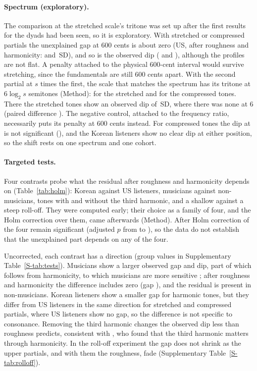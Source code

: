 \documentclass[11pt,a4paper]{article}
\newcommand{\SDu}{\,SD}
\begin{document}
\paragraph{Spectrum (exploratory).}
The comparison at the stretched scale's tritone was set up after the first results for the
dyads had been seen, so it is exploratory.
With stretched or compressed partials the unexplained gap at 600 cents is about zero (US,
after roughness and harmonicity: \gapHKHStr{} and \gapHKHComp\SDu), and so is the observed
dip (\dipObsStr{} and \dipObsComp), although the profiles are not flat. A penalty attached
to the physical 600-cent interval would survive stretching, since the fundamentals are still
600 cents apart. With the second partial at $s$ times the first, the scale that matches the
spectrum has its tritone at $6\log_2 s$ semitones (Method): \sscPosStr{} for the stretched and
\sscPosComp{} for the compressed tones. There the stretched tones show an observed dip of
\sscObsDipStr\SDu, where there was none at 6 (paired difference \sscObsDipStrDiff). The
negative control, attached to the frequency ratio, necessarily puts its penalty at 600
cents instead. For compressed tones the dip at \sscPosComp{} is not significant
(\sscObsDipComp), and the Korean listeners show no clear dip at either position, so the
shift rests on one spectrum and one cohort.

\paragraph{Targeted tests.}
Four contrasts probe what the residual after roughness and harmonicity depends on
(Table~\ref{tab:holm}): Korean against US listeners, musicians against non-musicians, tones
with and without the third harmonic, and a shallow against a steep roll-off. They were
computed early; their choice as a family of four, and the Holm correction over them, came
afterwards (Method). After Holm correction \holmNsurvive{} of the four remain significant
(adjusted $p$ from \holmPadjThird{} to \holmPadjRoll), so the data do not establish that the
unexplained part depends on any of the four.

Uncorrected, each contrast has a direction (group values in Supplementary
Table~\ref{S-tab:tests}). Musicians show a larger observed gap and dip, part of which follows
from harmonicity, to which musicians are more sensitive \citep{mcdermott2010}; after
roughness and harmonicity the difference includes zero (gap \musPoolGapHKH), and the
residual is present in non-musicians. Korean listeners show a smaller gap for harmonic
tones, but they differ from US listeners in the same direction for stretched and compressed
partials, where US listeners show no gap, so the difference is not specific to consonance.
Removing the third harmonic changes the observed dip less than roughness predicts,
consistent with \citet{marjieh2024}, who found that the third harmonic matters through
harmonicity. In the roll-off experiment the gap does not shrink as the upper partials, and
with them the roughness, fade (Supplementary Table~\ref{S-tab:rolloff}).
\end{document}
